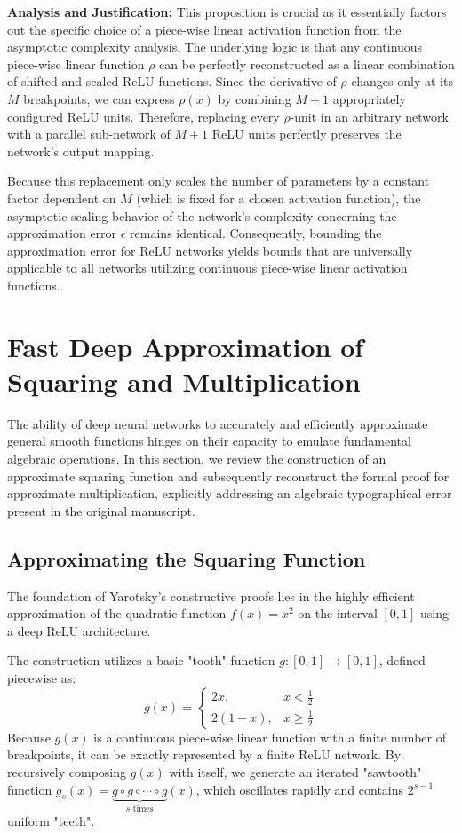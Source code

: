 \documentclass[12pt]{article}
\begin{document}
\textbf{Analysis and Justification:} This proposition is crucial as it essentially factors out the specific choice of a piece-wise linear activation function from the asymptotic complexity analysis. The underlying logic is that any continuous piece-wise linear function $\rho$ can be perfectly reconstructed as a linear combination of shifted and scaled ReLU functions. Since the derivative of $\rho$ changes only at its $M$ breakpoints, we can express $\rho(x)$ by combining $M+1$ appropriately configured ReLU units. Therefore, replacing every $\rho$-unit in an arbitrary network with a parallel sub-network of $M+1$ ReLU units perfectly preserves the network's output mapping. 

Because this replacement only scales the number of parameters by a constant factor dependent on $M$ (which is fixed for a chosen activation function), the asymptotic scaling behavior of the network's complexity concerning the approximation error $\epsilon$ remains identical. Consequently, bounding the approximation error for ReLU networks yields bounds that are universally applicable to all networks utilizing continuous piece-wise linear activation functions.





\section{Fast Deep Approximation of Squaring and Multiplication}

The ability of deep neural networks to accurately and efficiently approximate general smooth functions hinges on their capacity to emulate fundamental algebraic operations. In this section, we review the construction of an approximate squaring function and subsequently reconstruct the formal proof for approximate multiplication, explicitly addressing an algebraic typographical error present in the original manuscript.

\subsection{Approximating the Squaring Function}
The foundation of Yarotsky's constructive proofs lies in the highly efficient approximation of the quadratic function $f(x) = x^2$ on the interval $[0,1]$ using a deep ReLU architecture. 

The construction utilizes a basic "tooth" function $g: [0,1] \to [0,1]$, defined piecewise as:
\begin{equation}
g(x) = \begin{cases} 
2x, & x < \frac{1}{2} \\ 
2(1-x), & x \ge \frac{1}{2} 
\end{cases}
\end{equation}
Because $g(x)$ is a continuous piece-wise linear function with a finite number of breakpoints, it can be exactly represented by a finite ReLU network. By recursively composing $g(x)$ with itself, we generate an iterated "sawtooth" function $g_s(x) = \underbrace{g \circ g \circ \cdots \circ g}_{s \text{ times}}(x)$, which oscillates rapidly and contains $2^{s-1}$ uniform "teeth".
\end{document}
